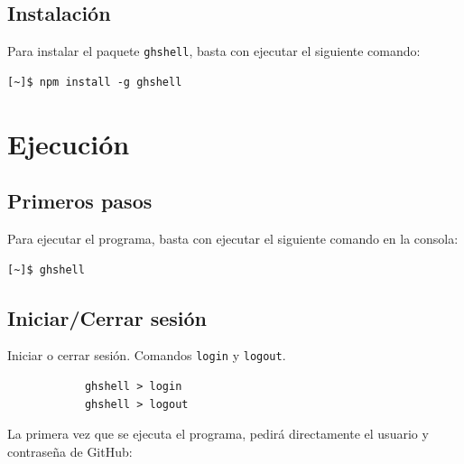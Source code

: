 \subsection{Instalación}
\label{subsec:b.1.3}

Para instalar el paquete \verb|ghshell|, basta con ejecutar el siguiente comando:

\begin{verbatim}
[~]$ npm install -g ghshell
\end{verbatim}



\section{Ejecución}
\label{Apendice2:ejecucion}

\subsection{Primeros pasos}
\label{subsec:b.2.1}

Para ejecutar el programa, basta con ejecutar el siguiente comando en la consola:

\begin{verbatim}
[~]$ ghshell
\end{verbatim}


\subsection{Iniciar/Cerrar sesión}
\label{subsec:b.2.1}
    
    Iniciar o cerrar sesión. Comandos \verb|login| y \verb|logout|. 
    
    	\begin{verbatim}
			ghshell > login
			ghshell > logout
		\end{verbatim}
    
    La primera vez que se ejecuta el programa, pedirá directamente el usuario y contraseña de GitHub:
    

